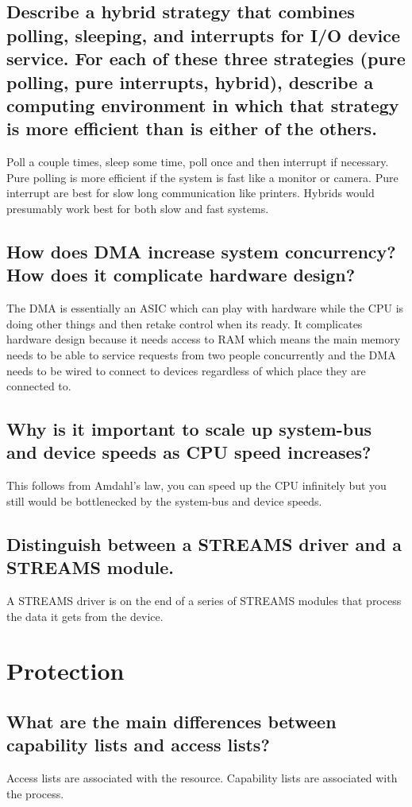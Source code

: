 \documentclass{book}%
\begin{document}
\section{Describe a hybrid strategy that combines polling, sleeping, and interrupts for I/O device service. For each of these three strategies (pure polling, pure interrupts, hybrid), describe a computing environment in which that strategy is more efficient than is either of the others.}
Poll a couple times, sleep some time, poll once and then interrupt if necessary.
Pure polling is more efficient if the system is fast like a monitor or camera.
Pure interrupt are  best for slow long communication like printers.
Hybrids would presumably work best for both slow and fast systems.
\section{How does DMA increase system concurrency? How does it complicate hardware design?} 
The DMA is essentially an ASIC which can play with hardware while the CPU is doing other things and then retake control when its ready. It complicates hardware design because it needs access to RAM which means the main memory needs to be able to service requests from two people concurrently and the DMA needs to be wired to connect to devices regardless of which place they are connected to.
\section{Why is it important to scale up system-bus and device speeds as CPU speed increases?}
This follows from Amdahl's law, you can speed up the CPU infinitely but you still would be bottlenecked by the system-bus and device speeds.
\section{Distinguish between a STREAMS driver and a STREAMS module.}
A STREAMS driver is on the end of a series of STREAMS modules that process the data it gets from the device.
\chapter{Protection}
\section{What are the main differences between capability lists and access lists?}
Access lists are associated with the resource. Capability lists are associated with the process.
\end{document}
